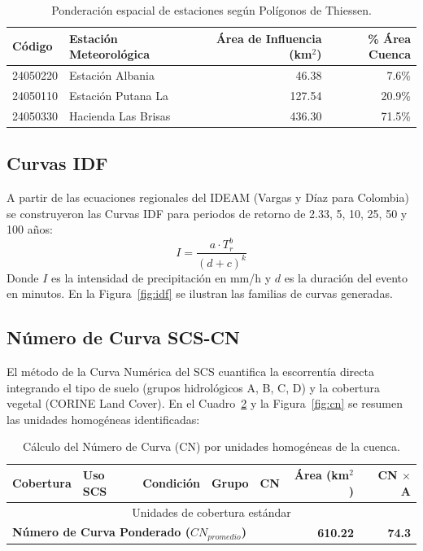 \documentclass[11pt,a4paper]{article}
\begin{document}
\begin{table}[H]
\centering
\caption{Ponderación espacial de estaciones según Polígonos de Thiessen.}
\label{tab:thiessen}
\begin{tabular}{llrr}\toprule
\textbf{Código} & \textbf{Estación Meteorológica} & \textbf{Área de Influencia (km$^2$)} & \textbf{\% Área Cuenca} \\\midrule
24050220 & Estación Albania & 46.38 & 7.6\% \\
24050110 & Estación Putana La & 127.54 & 20.9\% \\
24050330 & Hacienda Las Brisas & 436.30 & 71.5\% \\
\bottomrule
\end{tabular}
\end{table}



\subsection{Curvas IDF}
A partir de las ecuaciones regionales del IDEAM (Vargas y Díaz para Colombia) se construyeron las Curvas IDF para periodos de retorno de 2.33, 5, 10, 25, 50 y 100 años:
\begin{equation}
I = \frac{a \cdot T_r^b}{(d + c)^k}
\end{equation}
Donde $I$ es la intensidad de precipitación en mm/h y $d$ es la duración del evento en minutos. En la Figura~\ref{fig:idf} se ilustran las familias de curvas generadas.



\subsection{Número de Curva SCS-CN}
El método de la Curva Numérica del SCS cuantifica la escorrentía directa integrando el tipo de suelo (grupos hidrológicos A, B, C, D) y la cobertura vegetal (CORINE Land Cover). En el Cuadro~\ref{tab:cn} y la Figura~\ref{fig:cn} se resumen las unidades homogéneas identificadas:

\begin{table}[H]
\centering
\caption{Cálculo del Número de Curva (CN) por unidades homogéneas de la cuenca.}
\label{tab:cn}
\begin{tabular}{llllrrr}\toprule
\textbf{Cobertura} & \textbf{Uso SCS} & \textbf{Condición} & \textbf{Grupo} & \textbf{CN} & \textbf{Área (km$^2$)} & \textbf{CN $\times$ A} \\\midrule
\multicolumn{7}{c}{Unidades de cobertura estándar} \\
\midrule
\multicolumn{5}{l}{\textbf{Número de Curva Ponderado ($CN_{promedio}$)}} & \textbf{610.22} & \textbf{74.3} \\
\bottomrule
\end{tabular}
\end{table}
\end{document}

